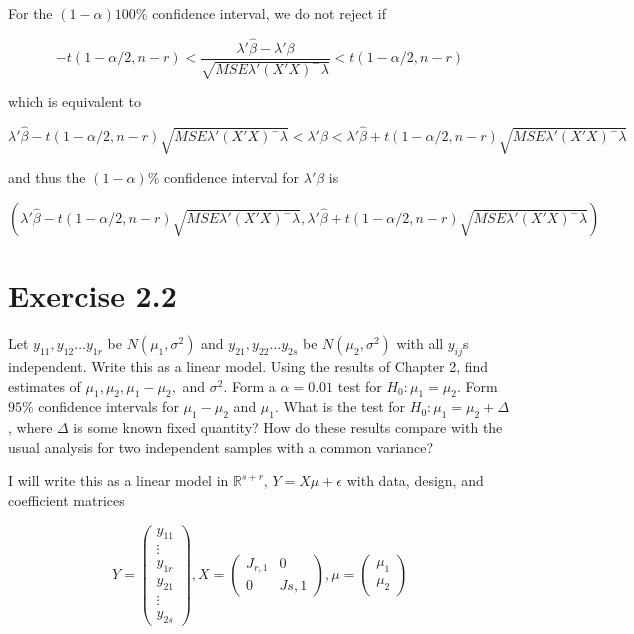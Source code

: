 \documentclass{article}
\newcommand{\R}{\mathbb{R}}
\begin{document}
For the $(1-\alpha)100\%$ confidence interval, we do not reject if

\[
-t(1-\alpha/2, n-r) < \frac{\lambda'\hat{\beta} - \lambda'\beta}{
\sqrt{MSE\lambda'(X'X)^-\lambda}
} < t(1-\alpha/2, n-r)
\]

which is equivalent to

\[
\lambda'\hat{\beta} - t(1-\alpha/2, n-r)\sqrt{MSE\lambda'(X'X)^-\lambda} < \lambda'\beta < \lambda'\hat{\beta} + t(1-\alpha/2, n-r)\sqrt{MSE\lambda'(X'X)^-\lambda}
\]

and thus the $(1-\alpha)$\% confidence interval for $\lambda'\beta$ is

\[
\left(
\lambda'\hat{\beta} - t(1-\alpha/2, n-r)\sqrt{MSE\lambda'(X'X)^-\lambda},  \lambda'\hat{\beta} + t(1-\alpha/2, n-r)\sqrt{MSE\lambda'(X'X)^-\lambda}
\right)
\]

\section*{Exercise 2.2}
Let $y_{11}, y_{12} \dots y_{1r}$ be $N(\mu_1, \sigma^2)$ and $y_{21}, y_{22} \dots y_{2s}$ be $N(\mu_2, \sigma^2)$ with all $y_{ij}$s independent. Write this as a linear model. Using the results of Chapter 2, find estimates of $\mu_1, \mu_2, \mu_1-\mu_2,$ and $\sigma^2$. Form a $\alpha = 0.01$ test for $H_0:\mu_1 = \mu_2$. Form $95\%$ confidence intervals for $\mu_1-\mu_2$ and $\mu_1$. What is the test for $H_0: \mu_1 = \mu_2 + \Delta$, where $\Delta$ is some known fixed quantity? How do these results compare with the usual analysis for two independent samples with a common variance?

I will write this as a linear model in $\R^{s+r}$, $Y=X\mu + \epsilon$ with data, design, and coefficient matrices

\[
Y = \begin{pmatrix}
y_{11} \\
\vdots \\
y_{1r} \\
y_{21} \\
\vdots \\
y_{2s}
\end{pmatrix},
X = \begin{pmatrix}
J_{r,1} & 0 \\
0 & J{s, 1}
\end{pmatrix},
\mu = \begin{pmatrix}
\mu_1 \\ \mu_2
\end{pmatrix}
\]
\end{document}
